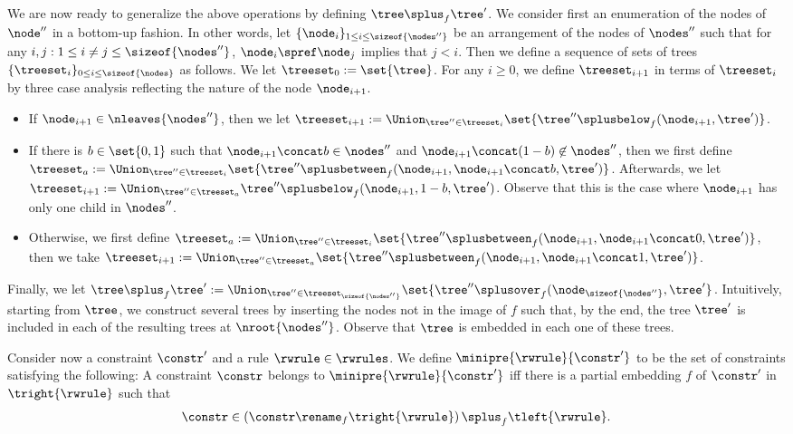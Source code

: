 We are now ready to generalize the above operations by defining $\tree\splus_f\tree'$.
%
We consider first an enumeration of the nodes of $\node''$ in a bottom-up fashion.
%
In other words, let $\{\node_i\}_{1\le i\le\sizeof{\nodes''}}$ be an arrangement of the nodes 
of $\nodes''$ such that for any $i,j:1\le i\neq j\le \sizeof{\nodes''}$, $\node_i\spref\node_j$ 
implies that $j < i$.
%
Then we define a sequence of sets of trees $\{\treeset_i\}_{0\le i\le\sizeof{\nodes}}$ 
as follows.
%
We let $\treeset_0:=\set{\tree}$.
%
For any $i\ge 0$, we define $\treeset_{i+1}$ in terms of $\treeset_i$ by three case analysis 
reflecting the nature of the node $\node_{i+1}$.
%
\begin{itemize}
\item If $\node_{i+1}\in\nleaves{\nodes''}$, then we let $\treeset_{i+1}:=\Union_{\tree''\in
\treeset_i}\set{\tree''\splusbelow_f(\node_{i+1},\tree')}$.
%
\item If there is $b\in\set{0,1}$ such that $\node_{i+1}\concat b\in\nodes''$ and 
$\node_{i+1}\concat (1-b)\not\in\nodes''$, then we first define $\treeset_a:=\Union_{\tree''
\in\treeset_i}\set{\tree''\splusbetween_f(\node_{i+1},\node_{i+1}\concat b,\tree')}$.
%
Afterwards, we let $\treeset_{i+1}:=\Union_{\tree''\in\treeset_a}\tree''\splusbelow_f(
\node_{i+1},1-b,\tree')$.
%
Observe that this is the case where $\node_{i+1}$ has only one child in $\nodes''$.
%
\item Otherwise, we first define $\treeset_a:=\Union_{\tree''\in\treeset_i}\set{\tree''
\splusbetween_f(\node_{i+1},\node_{i+1}\concat 0,\tree')}$, then we take $\treeset_{i+1}:=
\Union_{\tree''\in\treeset_a}\set{\tree''\splusbetween_f(\node_{i+1},\node_{i+1}\concat 1,\tree')}$.
\end{itemize}
%

Finally, we let $\tree\splus_f\tree':=\Union_{\tree''\in\treeset_{\sizeof{\nodes''}}}\set{\tree''
\splusover_f(\node_{\sizeof{\nodes''}},\tree'}$.
%
Intuitively, starting from $\tree$, we construct several trees by inserting the nodes 
not in the image of $f$ such that, by the end, the tree $\tree'$ is included in each of the resulting 
trees at $\nroot{\nodes''}$.
%
Observe that $\tree$ is embedded in each one of these trees.
%

Consider now a constraint $\constr'$ and a rule $\rwrule\in\rwrules$.
%
We define $\minipre{\rwrule}{\constr'}$ to be the set of constraints satisfying the following:
%
A constraint $\constr$ belongs to $\minipre{\rwrule}{\constr'}$ iff there is a partial embedding 
$f$ of $\constr'$ in $\tright{\rwrule}$ such that
%
\[
\constr\in\left(\constr\rename_f\tright{\rwrule}\right)\splus_f\tleft{\rwrule}\text{.}
\]
%



